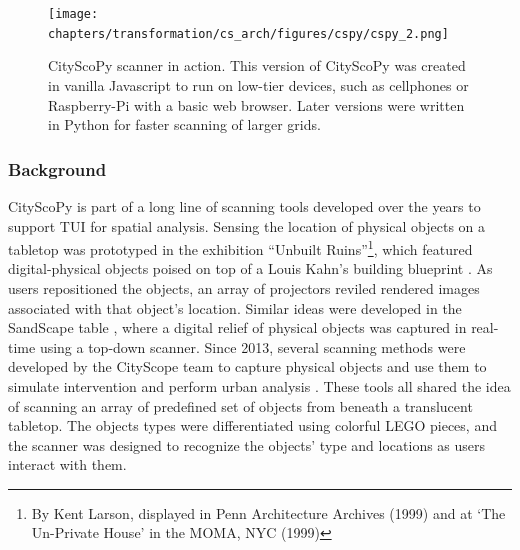 {{      \begin{figure}[!htb]
          \begin{center}
              \texttt{[image: chapters/transformation/cs\_arch/figures/cspy/cspy\_2.png]}
          \end{center}
          \caption{CityScoPy scanner in action. This version of CityScoPy was created in vanilla Javascript to run on low-tier devices, such as cellphones or Raspberry-Pi with a basic web browser. Later versions were written in Python for faster scanning of larger grids.}
          \label{fig:cspy_scan_in_action}
      \end{figure}

      \subsubsection{Background}
      {
          CityScoPy is part of a long line of scanning tools developed over the years to support TUI for spatial analysis. Sensing the location of physical objects on a tabletop was prototyped in the exhibition ``Unbuilt Ruins''\footnote{By Kent Larson, displayed in Penn Architecture Archives (1999) and at `The Un-Private House' in the MOMA, NYC (1999)}, which featured digital-physical objects poised on top of a Louis Kahn's building blueprint \cite{sparacino1999technologies}. As users repositioned the objects, an array of projectors reviled rendered images associated with that object's location. Similar ideas were developed in the SandScape table \cite{ishii2004bringing}, where a digital relief of physical objects was captured in real-time using a top-down scanner. Since 2013, several scanning methods were developed by the CityScope team to capture physical objects and use them to simulate intervention and perform urban analysis \cite{Hadhrawi2016, zhang2017citymatrix, aldawood2014interaction}. These tools all shared the idea of scanning an array of predefined set of objects from beneath a translucent tabletop. The objects types were differentiated using colorful LEGO pieces, and the scanner was designed to recognize the objects' type and locations as users interact with them.
      }
}}
